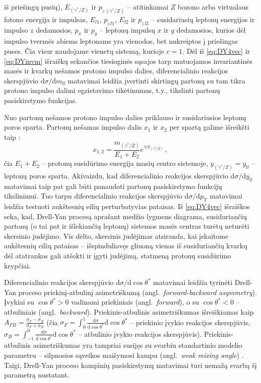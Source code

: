 \documentclass[a4paper, 12pt, oneside]{article}
\newcommand{\pT}{p_{\mathrm{T}}}
\newlength\q
\begin{document}
iš priešingų pusių), $E_{(\gamma^*\!/\!Z)}$ ir $p_{z\,(\gamma^*\!/\!Z)}$ -- atitinkamai $Z$ bozono arba virtualaus fotono energija ir
impulsas, $E_{l1}$, $p_{z\,l1}$, $E_{l2}$ ir $p_{z\,l2}$ -- susidariusių leptonų energijos ir impulso $z$ dedamosios, $p_{x}$ ir $p_{y}$ --
leptonų impulsų $x$ ir $y$ dedamosios, kurios dėl impulso tvermės abiems leptonams yra vienodos, bet nukreiptos į priešingas puses.
Čia visur naudojame vienetų sistemą, kurioje $c=1$.
Dėl iš \eqref{eq:DY4vec} ir \eqref{eq:DYinvm} išraiškų sekančios tiesioginės sąsajos tarp matuojamos invariantinės masės ir kvarkų
nešamos protono impulso dalies, diferencialinio reakcijos skerspjūvio $\mathrm{d}\sigma/\mathrm{d}m_{ll}$
matavimai leidžia įvertinti skirtingų partonų su tam tikra protono impulso dalimi egzistavimo tikėtinumus,
t.y., tikslinti partonų pasiskirstymo funkcijas.

Nuo partonų nešamos protono impulso dalies priklauso ir susidariusios leptonų poros sparta.
Partonų nešamas impulso dalis $x_1$ ir $x_2$ per spartą galime išreikšti taip \cite{DYrapi}:
\begin{equation}
	x_{1,2} = \frac{m_{(\gamma^*\!/\!Z)}}{E_1+E_2}e^{\pm y_{(\gamma^*\!/\!Z)}} \, ,
\end{equation}
čia $E_1\!+\!E_2$ -- protonų susidūrimo energija masių centro sistemoje, $y_{(\gamma^*\!/\!Z)}\!=\!y_{ll}$ -- leptonų poros sparta.
Akivaizdu, kad diferencialinio reakcijos skerspjūvio $\mathrm{d}\sigma/\mathrm{d}y_{ll}$ matavimai taip pat gali būti
panaudoti partonų pasiskirstymo funkcijų tikslinimui.
Tuo tarpu diferencialinio reakcijos skerspjūvio $\mathrm{d}\sigma/\mathrm{d}\pT$ matavimai leidžia testuoti aukštesnių eilių
perturbatyvias pataisas.
Iš \eqref{eq:DY4vec} išraiškos seka, kad, Drell-Yan procesą aprašant medžio lygmens diagrama, susiduriančių partonų
(o tai pat ir išlekiančių leptonų) sistemos masės centras turėtų neturėti skersinio judėjimo.
Vis dėlto, skersinis judėjimas atsiranda, kai įskaitome aukštesnių eilių pataisas -- išspinduliavęs gliuoną vienas iš susiduriančių
kvarkų dėl atatrankos gali atšokti ir įgyti judėjimą, statmeną protonų susidūrimo krypčiai.

Diferencialinio reakcijos skerspjūvio $\mathrm{d}\sigma/\mathrm{d}\!\cos\theta^*$ matavimai leidžia tyrinėti Drell-Yan proceso
priekinį-atbulinį asimetriškumą (angl.\ \textit{forward-backward asymmetry}).
Įvykiai su $\cos\theta^*\!\!>\!0$ vadinami priekiniais (angl.\ \textit{forward}), o su $\cos\theta^*\!\!<\!0$ -- atbuliniais
(angl.\ \textit{backward}).
Priekinis-atbulinis asimetriškumas išreiškiamas kaip $A_{FB}=\frac{\sigma_F-\sigma_B}{\sigma_F+\sigma_B}$
(čia $\sigma_F \!=\! \int_0^1\!\frac{\mathrm{d}\sigma}{\mathrm{d\!\cos}\theta^*}\mathrm{d}\!\cos\!\theta^*$ -- priekinio įvykio reakcijos
skerspjūvis, $\sigma_B \!=\! \int_{-1}^0\!\frac{\mathrm{d}\sigma}{\mathrm{d\!\cos}\theta^*}\mathrm{d}\!\cos\!\theta^*$ -- atbulinio įvykio
reakcijos skerspjūvis).
Priekinis-atbulinis asimetriškumas yra tampriai susijęs su svarbiu standartinio modelio parametru -- silpnosios sąveikos maišymosi kampu
(angl.\ \textit{weak mixing angle}) \cite{DYAFB_CMS2011, DYAFB_ATLAS2015, DYAFB_LHCb2015, DYAFB_CMS2018}.
Taigi, Drell-Yan proceso kampinių pasiskirstymų matavimai turi nemažą svarbą šį parametrą nustatant.
\end{document}
